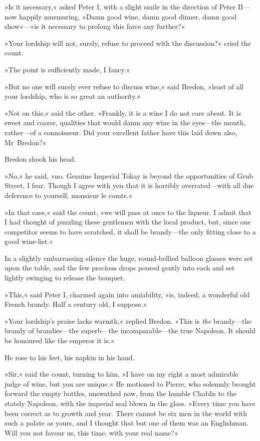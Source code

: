 »Is it necessary,« asked Peter I, with a slight smile in the direction of Peter II—now happily murmuring, »Damn good wine, damn good dinner, damn good show«—»is it necessary to prolong this farce any further?«

»Your lordship will not, surely, refuse to proceed with the discussion?« cried the count.

»The point is sufficiently made, I fancy.«

»But no one will surely ever refuse to discuss wine,« said Bredon, »least of all your lordship, who is so great an authority.«

»Not on this,« said the other. »Frankly, it is a wine I do not care about. It is sweet and coarse, qualities that would damn any wine in the eyes—the mouth, rather—of a connoisseur. Did your excellent father have this laid down also, Mr~Bredon?«

Bredon shook his head.

»No,« he said, »no. Genuine Imperial Tokay is beyond the opportunities of Grub Street, I fear. Though I agree with you that it is horribly overrated—with all due deference to yourself, monsieur le comte.«

»In that case,« said the count, »we will pass at once to the liqueur. I admit that I had thought of puzzling these gentlemen with the local product, but, since one competitor seems to have scratched, it shall be brandy—the only fitting close to a good wine-list.«

In a slightly embarrassing silence the huge, round-bellied balloon glasses were set upon the table, and the few precious drops poured gently into each and set lightly swinging to release the bouquet.

»This,« said Peter I, charmed again into amiability, »is, indeed, a wonderful old French brandy. Half a century old, I suppose.«

»Your lordship's praise lacks warmth,« replied Bredon. »This is \textit{the} brandy—the brandy of brandies—the superb—the incomparable—the true Napoleon. It should be honoured like the emperor it is.«

He rose to his feet, his napkin in his hand.

»Sir,« said the count, turning to him, »I have on my right a most admirable judge of wine, but you are unique.« He motioned to Pierre, who solemnly brought forward the empty bottles, unswathed now, from the humble Chablis to the stately Napoleon, with the imperial seal blown in the glass. »Every time you have been correct as to growth and year. There cannot be six men in the world with such a palate as yours, and I thought that but one of them was an Englishman. Will you not favour us, this time, with your real name?«

